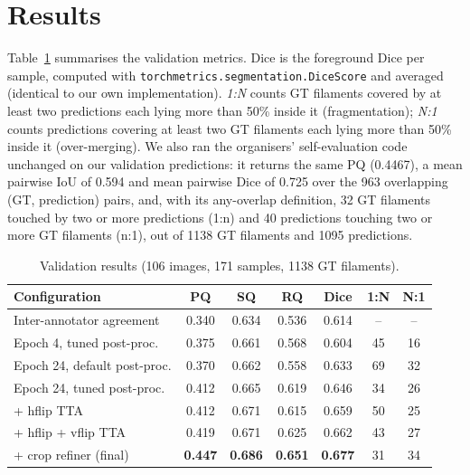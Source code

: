 \section{Results}
Table~\ref{tab:main} summarises the validation metrics. Dice is the foreground Dice per sample,
computed with \texttt{torchmetrics.segmentation.DiceScore} and averaged (identical to our own
implementation). \emph{1:N} counts GT filaments covered by at least two predictions each lying more
than 50\% inside it (fragmentation); \emph{N:1} counts predictions covering at least two GT filaments
each lying more than 50\% inside it (over-merging). We also ran the organisers' self-evaluation
code unchanged on our validation predictions: it returns the same PQ (0.4467), a mean pairwise IoU
of 0.594 and mean pairwise Dice of 0.725 over the 963 overlapping (GT, prediction) pairs, and, with
its any-overlap definition, 32 GT filaments touched by two or more predictions (1:n) and 40
predictions touching two or more GT filaments (n:1), out of 1138 GT filaments and 1095
predictions.

\begin{table}[t]
\centering
\caption{Validation results (106 images, 171 samples, 1138 GT filaments).}
\label{tab:main}
\setlength{\tabcolsep}{3.5pt}
\begin{tabular}{lcccccc}
\toprule
Configuration & PQ & SQ & RQ & Dice & 1:N & N:1\\
\midrule
Inter-annotator agreement & 0.340 & 0.634 & 0.536 & 0.614 & -- & -- \\
Epoch 4, tuned post-proc. & 0.375 & 0.661 & 0.568 & 0.604 & 45 & 16\\
Epoch 24, default post-proc. & 0.370 & 0.662 & 0.558 & 0.633 & 69 & 32\\
Epoch 24, tuned post-proc. & 0.412 & 0.665 & 0.619 & 0.646 & 34 & 26\\
\quad + hflip TTA & 0.412 & 0.671 & 0.615 & 0.659 & 50 & 25\\
\quad + hflip + vflip TTA & 0.419 & 0.671 & 0.625 & 0.662 & 43 & 27\\
\quad + crop refiner (final) & \textbf{0.447} & \textbf{0.686} & \textbf{0.651} & \textbf{0.677} & 31 & 34\\
\bottomrule
\end{tabular}
\end{table}

